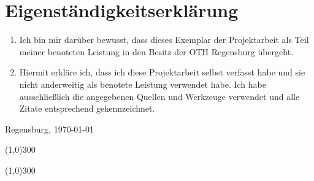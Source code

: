 \thispagestyle{empty}
\chapter*{Eigenständigkeitserklärung }

\bigskip
\bigskip
\bigskip

\begin{enumerate}
    \item Ich bin mir darüber bewusst, dass dieses Exemplar der Projektarbeit als Teil meiner benoteten Leistung in den Besitz der OTH Regensburg übergeht.
    \item Hiermit erkläre ich, dass ich diese Projektarbeit selbst verfasst habe und sie nicht anderweitig als benotete Leistung verwendet habe. Ich habe ausschließlich die angegebenen Quellen und Werkzeuge verwendet und alle Zitate entsprechend gekennzeichnet.
\end{enumerate}

\bigskip
\bigskip
\bigskip

\hfill Regensburg, \today

\vfill
    
\line(1,0){300}
\newline
\hspace*{4em}\studierenderNameone

\bigskip
\bigskip
\bigskip
\bigskip

\line(1,0){300}
\newline
\hspace*{4em}\studierenderNametwo